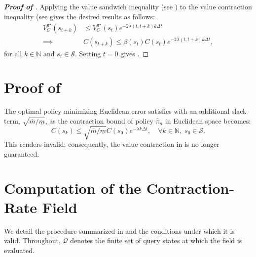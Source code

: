 \documentclass[lettersize,journal]{IEEEtran}
\newcommand{\mc}{\mathcal}
\newcommand{\mb}{\mathbb}
\begin{document}
\begin{proof}[\textbf{Proof of }]
    Applying the value sandwich inequality (see ) to the value contraction inequality (see  gives the desired results as follows:
    \begin{align}
        V^{\pi^\star}_{C}(s_{t + k}) & \leq  V^{\pi^\star}_{C}(s_t) e^{- 2 \overline{\lambda}(t, t+k) k \Delta t} \\
        \implies & C(s_{t + k}) \leq \beta(s_t) C(s_t) e^{- 2 \overline{\lambda}(t, t+k) k \Delta t},
    \end{align}
    for all $ k \in \mb{N}$ and $ s_t \in \mc{S}$. Setting $t = 0$ gives .
\end{proof}




\section{Proof of }\label{app:proof_of_remark}

The optimal policy minimizing Euclidean error satisfies  with an additional slack term, $\sqrt{\overline{m}/\underline{m}}$, as the contraction bound of policy $\hat \pi_n$ in Euclidean space becomes:
\begin{equation}
    C(s_{k}) \leq \sqrt{\overline{m}/\underline{m}} C(s_0) e^{- \lambda k \Delta t}, \quad \forall k \in \mb{N}, \; s_0 \in \mc{S}.
\end{equation}
This renders  invalid; consequently, the value contraction in  is no longer guaranteed.


\section{Computation of the Contraction-Rate Field}\label{app:rate_field}

We detail the procedure summarized in  and
the conditions under which it is valid. Throughout, $\mathcal{Q}$ denotes the
finite set of query states at which the field is evaluated.
\end{document}
